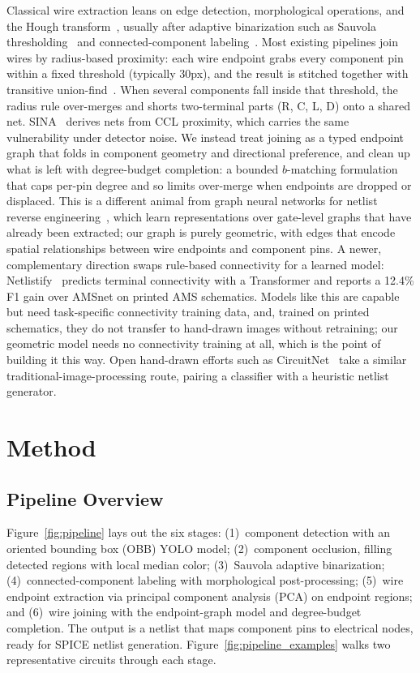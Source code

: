 \documentclass{ieeeaccess}
\begin{document}
Classical wire extraction leans on edge detection, morphological operations, and the Hough transform~\cite{duda1972hough}, usually after adaptive binarization such as Sauvola thresholding~\cite{sauvola2000} and connected-component labeling~\cite{he2017ccl}. Most existing pipelines join wires by radius-based proximity: each wire endpoint grabs every component pin within a fixed threshold (typically 30px), and the result is stitched together with transitive union-find~\cite{tarjan1975union}. When several components fall inside that threshold, the radius rule over-merges and shorts two-terminal parts (R, C, L, D) onto a shared net. SINA~\cite{sina2026} derives nets from CCL proximity, which carries the same vulnerability under detector noise. We instead treat joining as a typed endpoint graph that folds in component geometry and directional preference, and clean up what is left with degree-budget completion: a bounded $b$-matching formulation~\cite{kuhn1955,schrijver2003combinatorial} that caps per-pin degree and so limits over-merge when endpoints are dropped or displaced. This is a different animal from graph neural networks for netlist reverse engineering~\cite{alrahis2021gnn}, which learn representations over gate-level graphs that have already been extracted; our graph is purely geometric, with edges that encode spatial relationships between wire endpoints and component pins. A newer, complementary direction swaps rule-based connectivity for a learned model: Netlistify~\cite{netlistify2025} predicts terminal connectivity with a Transformer and reports a 12.4\% F1 gain over AMSnet on printed AMS schematics. Models like this are capable but need task-specific connectivity training data, and, trained on printed schematics, they do not transfer to hand-drawn images without retraining; our geometric model needs no connectivity training at all, which is the point of building it this way. Open hand-drawn efforts such as CircuitNet~\cite{circuitnet} take a similar traditional-image-processing route, pairing a classifier with a heuristic netlist generator.

\section{Method}

\subsection{Pipeline Overview}

Figure~\ref{fig:pipeline} lays out the six stages: (1)~component detection with an oriented bounding box (OBB) YOLO model; (2)~component occlusion, filling detected regions with local median color; (3)~Sauvola adaptive binarization; (4)~connected-component labeling with morphological post-processing; (5)~wire endpoint extraction via principal component analysis (PCA) on endpoint regions; and (6)~wire joining with the endpoint-graph model and degree-budget completion. The output is a netlist that maps component pins to electrical nodes, ready for SPICE netlist generation. Figure~\ref{fig:pipeline_examples} walks two representative circuits through each stage.
\end{document}
